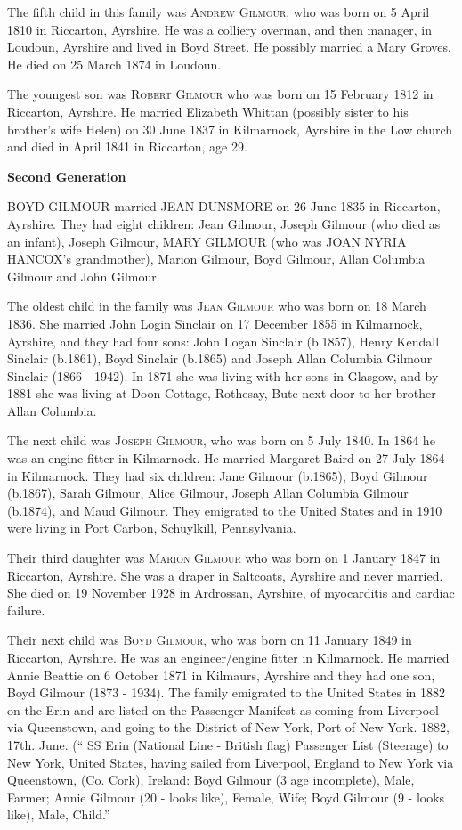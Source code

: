 The fifth child in this family was \textsc{Andrew Gilmour}, who was born on 5 April 1810 in Riccarton, Ayrshire. He was a colliery overman, and then manager, in Loudoun, Ayrshire and lived in Boyd Street. He possibly married a Mary Groves.  He died 
on 25 March 1874 in Loudoun.

The youngest son was \textsc{Robert Gilmour}  who was born on 15 February 1812 in Riccarton, Ayrshire. He married Elizabeth Whittan (possibly sister to his brother's wife Helen) on 30 June 1837 in Kilmarnock, Ayrshire in the Low church and died in April 1841 in Riccarton, age 29.

\textbf{Second Generation}

\uppercase{Boyd Gilmour} married \uppercase{Jean Dunsmore} on 26 June 1835 in Riccarton, Ayrshire.  They had eight children:  Jean Gilmour, Joseph Gilmour (who died as an infant), Joseph Gilmour, \uppercase{Mary Gilmour} (who was \uppercase{Joan Nyria Hancox}'s grandmother), Marion Gilmour, Boyd Gilmour, Allan Columbia Gilmour and John Gilmour. 

The oldest child in the family was \textsc{Jean Gilmour} who was born on 18 March 1836. She married John Login Sinclair on 17 December 1855 in Kilmarnock, Ayrshire, and they had four sons: John Logan Sinclair (b.1857), Henry Kendall Sinclair (b.1861), 
Boyd Sinclair (b.1865) and Joseph Allan Columbia Gilmour Sinclair (1866 - 1942).  In 1871 she was living with her sons in Glasgow, and by 1881 she was living at Doon Cottage, Rothesay, Bute next door to her brother Allan Columbia.

The next child was \textsc{Joseph Gilmour}, who was born on 5 July 1840. In 1864 he was an engine fitter in Kilmarnock. He married Margaret Baird on 27 July 1864 in Kilmarnock. They had six children: Jane Gilmour (b.1865), Boyd Gilmour (b.1867), Sarah Gilmour, Alice Gilmour, Joseph Allan Columbia Gilmour (b.1874), and Maud Gilmour. They emigrated to the United States and in 1910 were living in Port Carbon, Schuylkill, Pennsylvania.

Their third daughter was \textsc{Marion Gilmour} who was born on 1 January 1847 in Riccarton, Ayrshire. She was a draper in Saltcoats, Ayrshire and never married. She died on 19 November 1928 in Ardrossan, Ayrshire, of myocarditis and cardiac failure.

Their next child was \textsc{Boyd Gilmour}, who was born on 11 January 1849 in Riccarton, Ayrshire. He was an engineer/engine fitter in Kilmarnock. He married Annie Beattie on 6 October 1871 in Kilmaurs, Ayrshire and they had one son, Boyd Gilmour (1873 - 1934). The family emigrated to the United States in 1882 on the Erin and are listed on the Passenger Manifest as coming from Liverpool via Queenstown, and going to the District of New York, Port of New York. 1882, 17th. June. (`` SS Erin (National Line - British flag) Passenger List (Steerage) to New York, United States, having sailed from Liverpool, England to New York via Queenstown, (Co. Cork), Ireland: Boyd Gilmour (3 age incomplete), Male, Farmer; Annie Gilmour (20 - looks like), Female, Wife; Boyd Gilmour (9 - looks like), Male, Child.''

